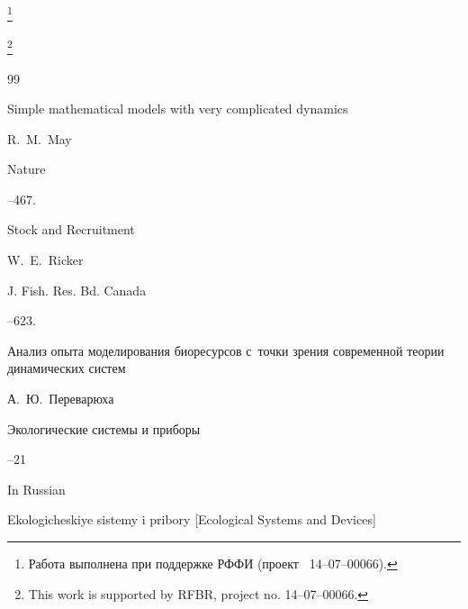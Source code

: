 \thanks{Работа выполнена при поддержке РФФИ (проект \No~14--07--00066).}



\thanks{This work is supported by RFBR, project no. 14--07--00066.}



\newpage



\begin{thebibliography}{99}




\paper Simple mathematical models with very complicated dynamics

\by R.~M.~May

\jour Nature



--467.











\paper Stock and Recruitment 

\by W.~E.~Ricker

\jour J. Fish. Res. Bd. Canada




--623.









\paper Анализ опыта моделирования биоресурсов с~точки зрения современной теории динамических систем

\by А.~Ю.~Переварюха

\jour Экологические системы и приборы



--21

\misctransl

\lang In Russian

\jour Ekologicheskiye sistemy i pribory \rm [Ecological Systems and Devices]


\end{thebibliography}
